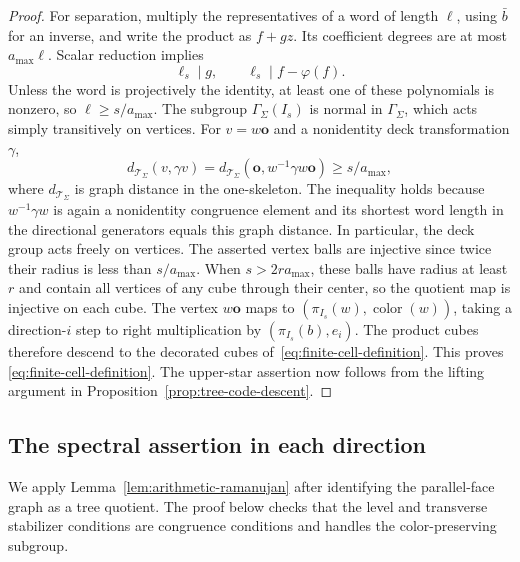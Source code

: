 \documentclass[11pt,letterpaper]{article}
\renewcommand{\ge}{\geqslant}
\theoremstyle{definition}
\theoremstyle{remark}
\begin{document}
\begin{proof}
For separation, multiply the representatives of a word of length
$\ell$, using $\bar b$ for an inverse, and write the product as
$f+gz$. Its coefficient degrees are at most $a_{\max}\ell$.
Scalar reduction implies
\[
 \ell_s\mid g,\qquad \ell_s\mid f-\varphi(f).
\]
Unless the word is projectively the identity, at least one of
these polynomials is nonzero, so $\ell\ge s/a_{\max}$.
The subgroup $\Gamma_\Sigma(I_s)$ is normal in
$\Gamma_\Sigma$, which acts simply transitively on vertices.
For $v=w\mathbf o$ and a nonidentity deck transformation $\gamma$,
\[
 d_{\mathcal T_\Sigma}(v,\gamma v)
 =d_{\mathcal T_\Sigma}(\mathbf o,w^{-1}\gamma w\mathbf o)
 \ge s/a_{\max},
\]
where $d_{\mathcal T_\Sigma}$ is graph distance in the one-skeleton.
The inequality holds because $w^{-1}\gamma w$ is again a nonidentity congruence element
and its shortest word length in the directional generators equals
this graph distance. In particular, the deck group acts freely on
vertices. The asserted vertex balls are injective since twice their
radius is less than $s/a_{\max}$. When $s>2ra_{\max}$, these balls
have radius at least $r$ and contain all vertices of any cube
through their center, so the quotient map is injective on each cube.
The vertex $w\mathbf o$ maps to
$(\pi_{I_s}(w),\operatorname{color}(w))$, taking a direction-$i$
step to right multiplication by $(\pi_{I_s}(b),e_i)$.
The product cubes therefore descend to the decorated cubes
of~\eqref{eq:finite-cell-definition}. This proves
\eqref{eq:finite-cell-definition}. The upper-star assertion now
follows from the lifting argument in
Proposition~\ref{prop:tree-code-descent}.
\end{proof}

\subsection{The spectral assertion in each direction}
\label{sec:spectral-certificate}

We apply Lemma~\ref{lem:arithmetic-ramanujan} after identifying
the parallel-face graph as a tree quotient. The proof below checks
that the level and transverse stabilizer conditions are congruence
conditions and handles the color-preserving subgroup.
\end{document}
